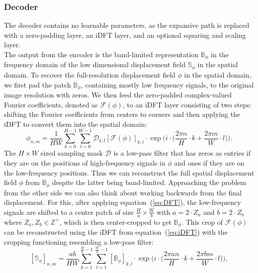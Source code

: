 \subsubsection{Decoder} \label{SubSubSec:Decoder}
The decoder contains no learnable parameters, as the expansive path is replaced with a zero-padding layer, an iDFT layer, and an optional squaring and scaling~\cite{ScaleAndSquare} layer. \\
The output from the encoder is the band-limited representation $\mathbb{B}_\phi$ in the frequency domain of the low dimensional displacement field $\mathbb{S}_\phi$ in the spatial domain. To recover the full-resolution displacement field $\phi$ in the spatial domain, we first pad the patch $\mathbb{B}_\phi$, containing mostly low frequency signals, to the original image resolution with zeros. We then feed the zero-padded complex-valued Fourier coefficients, denoted as $\mathcal{F}(\phi)$, to an iDFT layer consisting of two steps: shifting the Fourier coefficients from centers to corners and then applying the iDFT to convert them into the spatial domain:
\begin{equation} \label{eq:iDFT}
	\phi_{n,m} = \frac{1}{HW} \sum^{H-1}_{k=0} \sum^{W-1}_{l=0} \mathcal{D}_{k,l} [\mathcal{F}(\phi)]_{k,l} \cdot \exp \Bigg(i \cdot \bigg(\frac{2 \pi n}{H} \cdot k + \frac{2 \pi m}{W} \cdot l \bigg) \Bigg).
\end{equation}
The $H \times W$ sized sampling mask $\mathcal{D}$ is a low-pass filter that has zeros as entries if they are on the positions of high-frequency signals in $\phi$ and ones if they are on the low-frequency positions. Thus we can reconstruct the full spatial displacement field $\phi$ from $\mathbb{B}_\phi$ despite the latter being band-limited. Approaching the problem from the other side we can also think about working backwards from the final displacement. For this, after applying equation~(\ref{eq:DFT}), the low-frequency signals are shifted to a center patch of size $\frac{H}{a} \times \frac{W}{b}$ with $a = 2 \cdot Z_a$ and $ b = 2 \cdot Z_b$ where $ Z_a, Z_b \in \mathbb{Z}^+$, which is then center-cropped to get $\mathbb{B}_\phi$. This crop of $\mathcal{F}(\phi)$ can be reconstructed using the iDFT from equation~(\ref{eq:iDFT}) with the cropping functioning resembling a low-pass filter:
\begin{equation} \label{eq:decoder}
	[\mathbb{S}_\phi]_{n,m} = \frac{ab}{HW} \sum^{\frac{H}{a}-1}_{k=1} \sum^{\frac{W}{b}-1}_{l=1} [\mathbb{B}_\phi]_{k,l} \cdot \exp \Bigg(i \cdot \bigg(\frac{2 \pi a n}{H} \cdot k + \frac{2 \pi b m}{W} \cdot l \bigg) \Bigg),
\end{equation}
